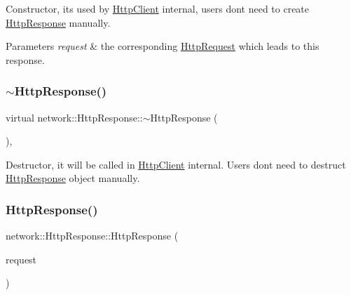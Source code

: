 Constructor, it\textquotesingle{}s used by \hyperlink{classnetwork_1_1HttpClient}{Http\+Client} internal, users don\textquotesingle{}t need to create \hyperlink{classnetwork_1_1HttpResponse}{Http\+Response} manually. 
\begin{DoxyParams}{Parameters}
{\em request} & the corresponding \hyperlink{classnetwork_1_1HttpRequest}{Http\+Request} which leads to this response. \\
\hline
\end{DoxyParams}
\mbox{\label{classnetwork_1_1HttpResponse_aa04ed598ec5a712beb9c2805d7da7d5e}} 
\subsubsection{\texorpdfstring{$\sim$\+Http\+Response()}{~HttpResponse()}\hspace{0.1cm}{\footnotesize\ttfamily [1/2]}}
{\footnotesize\ttfamily virtual network\+::\+Http\+Response\+::$\sim$\+Http\+Response (\begin{DoxyParamCaption}{ }\end{DoxyParamCaption})\hspace{0.3cm}{\ttfamily [inline]}, {\ttfamily [virtual]}}

Destructor, it will be called in \hyperlink{classnetwork_1_1HttpClient}{Http\+Client} internal. Users don\textquotesingle{}t need to destruct \hyperlink{classnetwork_1_1HttpResponse}{Http\+Response} object manually. \mbox{\label{classnetwork_1_1HttpResponse_a6d9176e90ac973214c91496bb2dee460}} 
\subsubsection{\texorpdfstring{Http\+Response()}{HttpResponse()}\hspace{0.1cm}{\footnotesize\ttfamily [2/2]}}
{\footnotesize\ttfamily network\+::\+Http\+Response\+::\+Http\+Response (\begin{DoxyParamCaption}\item[{\hyperlink{classnetwork_1_1HttpRequest}{Http\+Request} $\ast$}]{request }\end{DoxyParamCaption})\hspace{0.3cm}{\ttfamily [inline]}}


